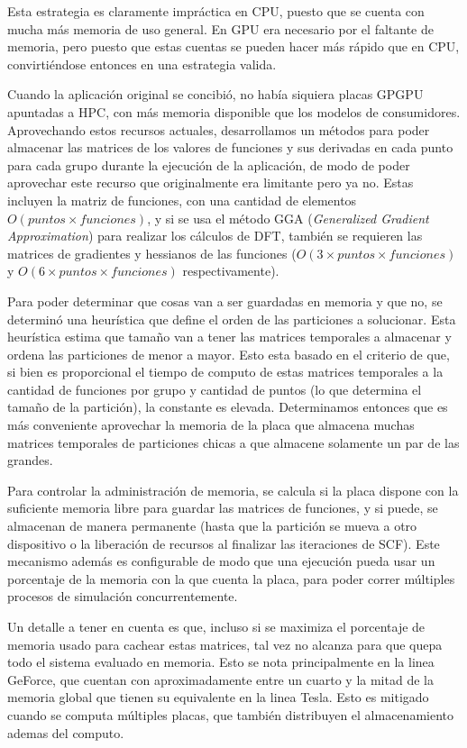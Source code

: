 Esta estrategia es claramente impr\'actica en CPU, puesto que se cuenta con mucha m\'as memoria
de uso general. En GPU era necesario por el faltante de memoria, pero puesto que estas cuentas se pueden
hacer m\'as r\'apido que en CPU, convirti\'endose entonces en una estrategia valida.

Cuando la aplicaci\'on original se concibi\'o, no hab\'ia siquiera placas GPGPU apuntadas a HPC, con
m\'as memoria disponible que los modelos de consumidores. Aprovechando estos recursos actuales,
desarrollamos un m\'etodos para poder almacenar las matrices de los valores de funciones y sus derivadas
en cada punto para cada grupo durante la ejecuci\'on de la aplicaci\'on, de modo de poder aprovechar
este recurso que originalmente era limitante pero ya no. Estas incluyen la matriz de funciones,
con una cantidad de elementos $O(puntos \times funciones)$, y si se usa el m\'etodo GGA
(\textit{Generalized Gradient Approximation}) para realizar los c\'alculos de DFT, tambi\'en se requieren
las matrices de gradientes y hessianos de las funciones ($O(3 \times puntos \times funciones)$ y
$O(6 \times puntos \times funciones)$ respectivamente).

Para poder determinar que cosas van a ser guardadas en memoria y que no, se determin\'o una heur\'istica
que define el orden de las particiones a solucionar. Esta heur\'istica estima que tama\~no van a
tener las matrices temporales a almacenar y ordena las particiones de menor a mayor. Esto
esta basado en el criterio de que, si bien es proporcional el tiempo de computo de estas matrices
temporales a la cantidad de funciones por grupo y cantidad de puntos (lo que determina el tama\~no
de la partici\'on), la constante es elevada. Determinamos entonces que es m\'as conveniente
aprovechar la memoria de la placa que almacena muchas matrices temporales de particiones chicas
a que almacene solamente un par de las grandes.

Para controlar la administraci\'on de memoria, se calcula si la placa dispone
con la suficiente memoria libre para guardar las matrices de funciones, y si puede, se almacenan de manera
permanente (hasta que la partici\'on se mueva a otro dispositivo o la liberaci\'on de recursos al
finalizar las iteraciones de SCF). Este mecanismo adem\'as es configurable de modo que una ejecuci\'on
pueda usar un porcentaje de la memoria con la que cuenta la placa, para poder correr m\'ultiples procesos de
simulaci\'on concurrentemente.

Un detalle a tener en cuenta es que, incluso si se maximiza el porcentaje de memoria usado para
cachear estas matrices, tal vez no alcanza para que quepa todo el sistema evaluado en memoria. Esto
se nota principalmente en la linea GeForce, que cuentan con aproximadamente entre un cuarto y la mitad
de la memoria global que tienen su equivalente en la linea Tesla. Esto es mitigado cuando se computa
m\'ultiples placas, que tambi\'en distribuyen el almacenamiento ademas del computo.


